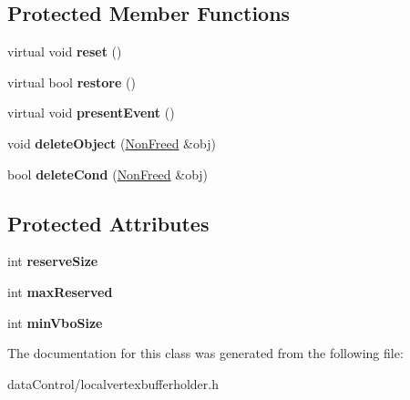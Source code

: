 \subsection*{Protected Member Functions}
\begin{DoxyCompactItemize}
\item 
\hypertarget{class_tempest_1_1_local_buffer_holder_a5c65e05dc74006a5b79fdc10e29a46be}{virtual void {\bfseries reset} ()}\label{class_tempest_1_1_local_buffer_holder_a5c65e05dc74006a5b79fdc10e29a46be}

\item 
\hypertarget{class_tempest_1_1_local_buffer_holder_a845f41dfc4e2c15d696e30fabe8b52ab}{virtual bool {\bfseries restore} ()}\label{class_tempest_1_1_local_buffer_holder_a845f41dfc4e2c15d696e30fabe8b52ab}

\item 
\hypertarget{class_tempest_1_1_local_buffer_holder_a656a8548e8640563edf24d4e4f18fe50}{virtual void {\bfseries present\+Event} ()}\label{class_tempest_1_1_local_buffer_holder_a656a8548e8640563edf24d4e4f18fe50}

\item 
\hypertarget{class_tempest_1_1_local_buffer_holder_a3e4ef2e3e05130b30d4bb3bc3289630d}{void {\bfseries delete\+Object} (\hyperlink{struct_tempest_1_1_local_buffer_holder_1_1_non_freed}{Non\+Freed} \&obj)}\label{class_tempest_1_1_local_buffer_holder_a3e4ef2e3e05130b30d4bb3bc3289630d}

\item 
\hypertarget{class_tempest_1_1_local_buffer_holder_a386217e7245de8840615bbda2b951387}{bool {\bfseries delete\+Cond} (\hyperlink{struct_tempest_1_1_local_buffer_holder_1_1_non_freed}{Non\+Freed} \&obj)}\label{class_tempest_1_1_local_buffer_holder_a386217e7245de8840615bbda2b951387}

\end{DoxyCompactItemize}
\subsection*{Protected Attributes}
\begin{DoxyCompactItemize}
\item 
\hypertarget{class_tempest_1_1_local_buffer_holder_af4ba5a032a03c249d103b14f91b5a6f3}{int {\bfseries reserve\+Size}}\label{class_tempest_1_1_local_buffer_holder_af4ba5a032a03c249d103b14f91b5a6f3}

\item 
\hypertarget{class_tempest_1_1_local_buffer_holder_aea0bc6dc142a40467dc6c675b03a0152}{int {\bfseries max\+Reserved}}\label{class_tempest_1_1_local_buffer_holder_aea0bc6dc142a40467dc6c675b03a0152}

\item 
\hypertarget{class_tempest_1_1_local_buffer_holder_a15767c147ab7a61d3e3626be5430508b}{int {\bfseries min\+Vbo\+Size}}\label{class_tempest_1_1_local_buffer_holder_a15767c147ab7a61d3e3626be5430508b}

\end{DoxyCompactItemize}


The documentation for this class was generated from the following file\+:\begin{DoxyCompactItemize}
\item 
data\+Control/localvertexbufferholder.\+h\end{DoxyCompactItemize}
